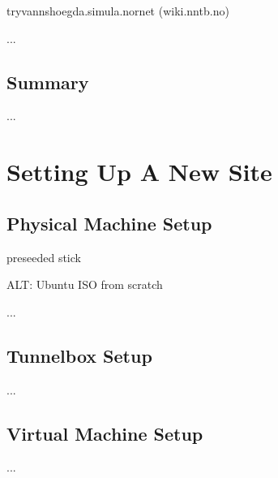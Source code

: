 tryvannshoegda.simula.nornet (wiki.nntb.no)

...


\section{Summary}

...




\chapter{Setting Up A New  Site}
\label{cha:Site-Setup}

\section{Physical Machine Setup}

preseeded stick

ALT: Ubuntu ISO from scratch

...

\section{Tunnelbox Setup}

...

\section{Virtual Machine Setup}

...
